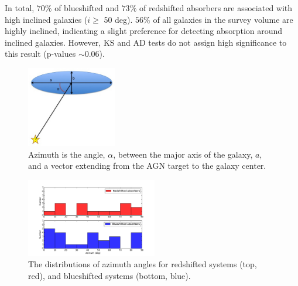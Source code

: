 \documentclass[iop]{emulateapj-rtx4}
\begin{document}
In total, $70\%$ of blueshifted and $73\%$ of redshifted absorbers are associated with high inclined galaxies ($i \geq$ 50 deg). $56\%$ of all galaxies in the survey volume are highly inclined, indicating a slight preference for detecting absorption around inclined galaxies. However, KS and AD tests do not assign high significance to this result (p-values $\sim0.06$).

\begin{figure}[h!]
        \centering
        \includegraphics[width=0.35\textwidth]{azimuth_illustration_cut.jpg}
        \caption{\small{Azimuth is the angle, $\alpha$, between the major axis of the galaxy, $a$, and a vector extending from the AGN target to the galaxy center.}}
        \label{azimuth_illustration}
\end{figure} 

\begin{figure}[h!]
        \centering
        \includegraphics[width=0.51\textwidth]{hist(azimuth)_dif_10.pdf}
        \caption{\small{The distributions of azimuth angles for redshifted systems (top, red), and blueshifted systems (bottom, blue).}}
        \label{azimuth_dist}
\end{figure} 
\end{document}
